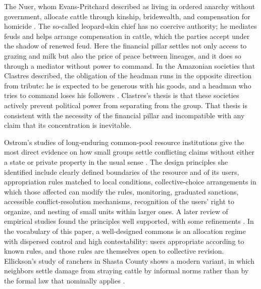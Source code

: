 \documentclass[11pt,letterpaper]{article}
\theoremstyle{definition}
\theoremstyle{remark}
\begin{document}
The Nuer, whom Evans-Pritchard described as living in ordered anarchy without government, allocate cattle through kinship, bridewealth, and compensation for homicide \citep{evanspritchard1940}. The so-called leopard-skin chief has no coercive authority; he mediates feuds and helps arrange compensation in cattle, which the parties accept under the shadow of renewed feud. Here the financial pillar settles not only access to grazing and milk but also the price of peace between lineages, and it does so through a mediator without power to command. In the Amazonian societies that Clastres described, the obligation of the headman runs in the opposite direction from tribute: he is expected to be generous with his goods, and a headman who tries to command loses his followers \citep{clastres1987}. Clastres's thesis is that these societies actively prevent political power from separating from the group. That thesis is consistent with the necessity of the financial pillar and incompatible with any claim that its concentration is inevitable.

Ostrom's studies of long-enduring common-pool resource institutions give the most direct evidence on how small groups settle conflicting claims without either a state or private property in the usual sense \citep{ostrom1990}. The design principles she identified include clearly defined boundaries of the resource and of its users, appropriation rules matched to local conditions, collective-choice arrangements in which those affected can modify the rules, monitoring, graduated sanctions, accessible conflict-resolution mechanisms, recognition of the users' right to organize, and nesting of small units within larger ones. A later review of empirical studies found the principles well supported, with some refinements \citep{cox2010}. In the vocabulary of this paper, a well-designed commons is an allocation regime with dispersed control and high contestability: users appropriate according to known rules, and those rules are themselves open to collective revision. Ellickson's study of ranchers in Shasta County shows a modern variant, in which neighbors settle damage from straying cattle by informal norms rather than by the formal law that nominally applies \citep{ellickson1991}.
\end{document}
